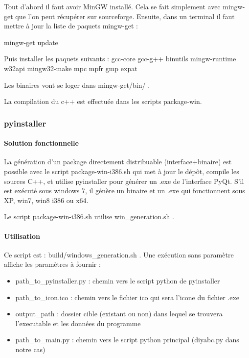 \documentclass[12pt,a4paper]{article}
\begin{document}
        Tout d'abord il faut avoir MinGW installé. Cela se fait simplement avec mingw-get
        que l'on peut récupérer sur sourceforge. Ensuite, dans un terminal il faut 
        mettre à jour la liste de paquets mingw-get :

        mingw-get update

        Puis installer les paquets suivants :
        gcc-core
        gcc-g++
        binutils
        mingw-runtime
        w32api
        mingw32-make
        mpc
        mpfr
        gmp
        expat

        Les binaires vont se loger dans mingw-get/bin/ .

        La compilation du c++ est effectuée dans les scripts package-win\*.

        \subsubsection{pyinstaller}

        \paragraph{Solution fonctionnelle}

        La génération d'un package directement distribuable (interface+binaire) est possible
        avec le script package-win-i386.sh qui met à jour le dépôt, compile les sources C++,
        et utilise pyinstaller pour générer un .exe de l'interface PyQt. S'il est exécuté sous windows
        7, il génère un binaire et un .exe qui fonctionnent sous XP, win7, win8 i386 ou x64.

        Le script package-win-i386.sh utilise win\_generation.sh . 

        \paragraph{Utilisation}

        Ce script est : build/windows\_generation.sh . Une 
        exécution sans paramètre affiche les paramètres à fournir : \\

        \begin{itemize}
            \item path\_to\_pyinstaller.py : chemin vers le script python de pyinstaller
            \item path\_to\_icon.ico : chemin vers le fichier ico qui sera l'icone du fichier .exe
            \item output\_path : dossier cible (existant ou non) dans lequel se trouvera l'executable et les données du programme
            \item path\_to\_main.py : chemin vers le script python principal (diyabc.py dans notre cas)\\
        \end{itemize}
\end{document}
